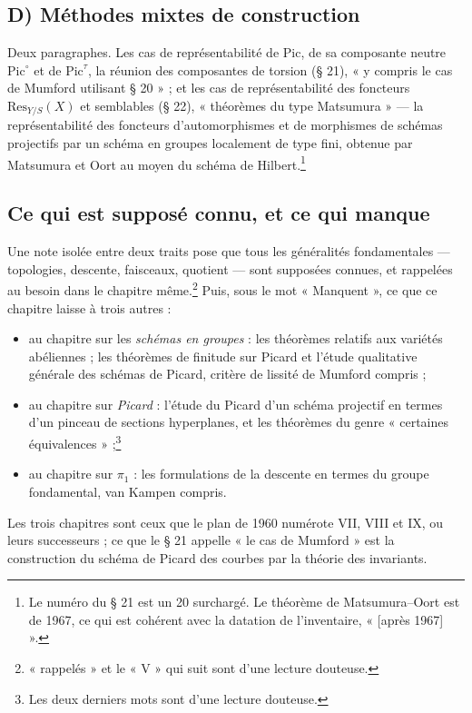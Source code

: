 \documentclass[11pt,a4paper]{article}
\begin{document}
\subsection*{D) Méthodes mixtes de construction}

Deux paragraphes. Les cas de représentabilité de $\mathrm{Pic}$, de sa
composante neutre $\mathrm{Pic}^{\circ}$ et de $\mathrm{Pic}^{\tau}$, la
réunion des composantes de torsion (§ 21), « y compris le cas de Mumford
utilisant § 20 » ; et les cas de représentabilité des foncteurs
$\mathrm{Res}_{Y/S}(X)$ et semblables (§ 22), « théorèmes du type
Matsumura » — la représentabilité des foncteurs d'automorphismes et de
morphismes de schémas projectifs par un schéma en groupes localement de type
fini, obtenue par Matsumura et Oort au moyen du schéma de
Hilbert.\footnote{Le numéro du § 21 est un 20 surchargé. Le théorème de
Matsumura--Oort est de 1967, ce qui est cohérent avec la datation de
l'inventaire, « [après 1967] ».}

\subsection*{Ce qui est supposé connu, et ce qui manque}

Une note isolée entre deux traits pose que tous les généralités fondamentales
— topologies, descente, faisceaux, quotient — sont supposées connues, et
rappelées au besoin dans le chapitre même.\footnote{« rappelés » et le « V »
qui suit sont d'une lecture douteuse.} Puis, sous le mot « Manquent », ce que
ce chapitre laisse à trois autres :

\begin{itemize}
  \item au chapitre sur les \emph{schémas en groupes} : les théorèmes relatifs
  aux variétés abéliennes ; les théorèmes de finitude sur Picard et l'étude
  qualitative générale des schémas de Picard, critère de lissité de Mumford
  compris ;
  \item au chapitre sur \emph{Picard} : l'étude du Picard d'un schéma
  projectif en termes d'un pinceau de sections hyperplanes, et les théorèmes
  du genre « certaines équivalences » ;\footnote{Les deux derniers mots sont
  d'une lecture douteuse.}
  \item au chapitre sur $\pi_1$ : les formulations de la descente en termes du
  groupe fondamental, van Kampen compris.
\end{itemize}

Les trois chapitres sont ceux que le plan de 1960 numérote VII, VIII et IX, ou
leurs successeurs ; ce que le § 21 appelle « le cas de Mumford » est la
construction du schéma de Picard des courbes par la théorie des invariants.
\end{document}
